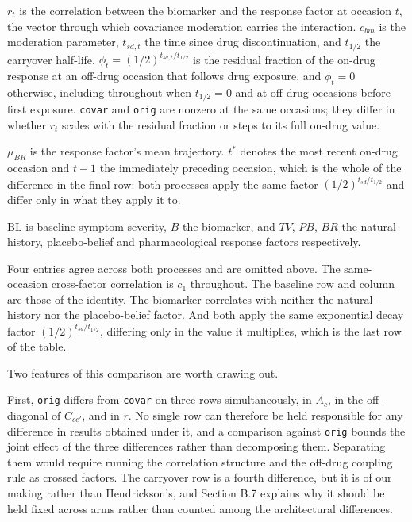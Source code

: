 \documentclass[
  11pt,
]{article}
\begin{document}
\begin{center}
\begin{minipage}{0.92\textwidth}
$r_t$ is the correlation between the biomarker and the response
factor at occasion $t$, the vector through which covariance
moderation carries the interaction. $c_{bm}$ is the moderation
parameter, $t_{sd,t}$ the time since drug discontinuation, and
$t_{1/2}$ the carryover half-life. $\phi_t = (1/2)^{t_{sd,t}/t_{1/2}}$
is the residual fraction of the on-drug response at an off-drug
occasion that follows drug exposure, and $\phi_t = 0$ otherwise,
including throughout when $t_{1/2} = 0$ and at off-drug occasions
before first exposure. \texttt{covar} and \texttt{orig} are nonzero
at the same occasions; they differ in whether $r_t$ scales with the
residual fraction or steps to its full on-drug value.

$\mu_{BR}$ is the response factor's mean trajectory. $t^{\ast}$
denotes the most recent on-drug occasion and $t-1$ the immediately
preceding occasion, which is the whole of the difference in the final
row: both processes apply the same factor $(1/2)^{t_{sd}/t_{1/2}}$ and
differ only in what they apply it to.

$\mathrm{BL}$ is baseline symptom severity, $B$ the
biomarker, and $TV$, $PB$, $BR$ the natural-history, placebo-belief
and pharmacological response factors respectively.
\end{minipage}
\end{center}

Four entries agree across both processes and are omitted above.
The same-occasion cross-factor correlation is \(c_1\) throughout. The
baseline row and column are those of the identity. The biomarker
correlates with neither the natural-history nor the placebo-belief
factor. And both apply the same exponential decay factor
\((1/2)^{t_{sd}/t_{1/2}}\), differing only in the value it multiplies,
which is the last row of the table.

Two features of this comparison are worth drawing out.

First, \texttt{orig} differs from \texttt{covar} on three rows
simultaneously, in \(A_c\), in the off-diagonal of \(C_{cc'}\), and in
\(r\). No single row can therefore be held responsible for any
difference in results obtained under it, and a comparison against
\texttt{orig} bounds the joint effect of the three differences rather
than decomposing them. Separating them would require running the
correlation structure and the off-drug coupling rule as crossed
factors.
The carryover row is a fourth difference, but it is of our making
rather than Hendrickson's, and Section B.7 explains why it should be
held fixed across arms rather than counted among the architectural
differences.
\end{document}
